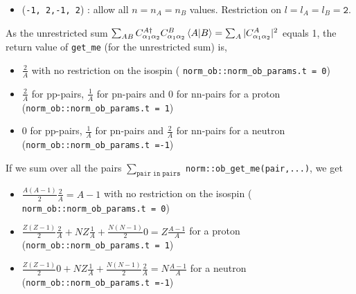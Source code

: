 \documentclass[10pt]{article}
\begin{document}
\begin{itemize}
\begin{itemize}
			\item (\texttt{-1, 2,-1, 2}) : allow all $n = n_A = 
n_B$ values. Restriction on $l = l_A = l_B = \texttt{2}$.
		\end{itemize}
	As the unrestricted sum $\sum_{ A B } C_{\alpha_1 \alpha_2}^{A \dagger} 
C_{\alpha_1 \alpha_2}^{B} \braket {A | B } = \sum_{A} | C^{A}_{\alpha_1 
\alpha_2}|^{2} $ equals 1, the return value of \texttt{get\_me} (for the 
unrestricted sum) is,
	\begin{itemize}
		\item $\frac{2}{A}$ with no restriction on the isospin ( 
\texttt{norm\_ob::norm\_ob\_params.t = 0})
		\item $\frac{2}{A}$ for pp-pairs, $\frac{1}{A}$ for pn-pairs 
and $0$ for nn-pairs for a proton (\texttt{norm\_ob::norm\_ob\_params.t~=~1})
		\item $0$ for pp-pairs, $\frac{1}{A}$ for pn-pairs and 
$\frac{2}{A}$ for nn-pairs for a neutron 
(\texttt{norm\_ob::norm\_ob\_params.t~=-1})
	\end{itemize}
	If we sum over all the pairs $ \sum_{\texttt{pair in pairs}} $ 
\texttt{norm::ob\_get\_me(pair,...)}, we get
	\begin{itemize}
		\item $\frac{A(A-1)}{2} \frac{2}{A} = A-1$ with no restriction 
on the isospin ( \texttt{norm\_ob::norm\_ob\_params.t~=~0})
		\item $\frac{Z(Z-1)}{2}\frac{2}{A} + NZ \frac{1}{A} + 
\frac{N(N-1)}{2} 0 = Z \frac{A-1}{A}$ for a proton 
(\texttt{norm\_ob::norm\_ob\_params.t~=~1})
		\item $\frac{Z(Z-1)}{2}0 + NZ \frac{1}{A} + \frac{N(N-1)}{2} 
\frac{2}{A} = N \frac{A-1}{A}$ for a neutron 
(\texttt{norm\_ob::norm\_ob\_params.t~=-1})
	\end{itemize}
\end{itemize}
\end{document}
